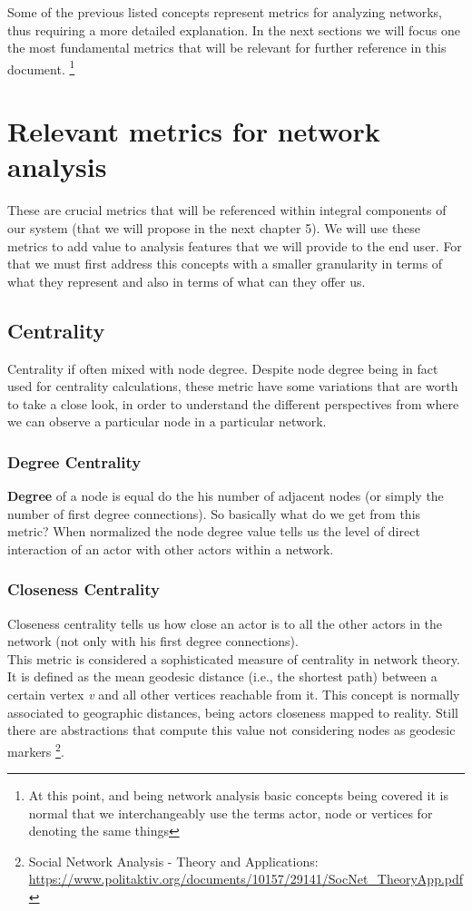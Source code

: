 Some of the previous listed concepts represent metrics for analyzing networks, thus requiring a more detailed explanation. In the next sections we will focus one the most fundamental metrics that will be relevant for further reference in this document. \footnote{At this point, and being network analysis basic concepts being covered it is normal that we interchangeably use the terms actor, node or vertices for denoting the same things}

\section{Relevant metrics for network analysis}
These are crucial metrics that will be referenced within integral components of our system (that we will propose in the next chapter 5). We will use these metrics to add value to analysis features that we will provide to the end user. For that we must first address this concepts with a smaller granularity in terms of
what they represent and also in terms of what can they offer us.

\subsection{Centrality}
Centrality if often mixed with node degree. Despite node degree being in fact used for centrality calculations, these metric have some variations
that are worth to take a close look, in order to understand the different perspectives from where we can observe a particular node in a particular network.

\subsubsection*{Degree Centrality}
\textbf{Degree} of a node is equal do the his number of adjacent nodes (or simply the number of first degree connections).
So basically what do we get from this metric? When normalized the node degree value tells us the level of direct interaction of an actor with other
actors within a network.

\subsubsection*{Closeness Centrality}
Closeness centrality tells us how close an actor is to all the other actors in the network (not only with his first degree connections).\\
\indent This metric is considered a sophisticated measure of centrality in network theory. It is defined as the mean geodesic distance
(i.e., the shortest path) between a certain vertex \textit{v} and all other vertices reachable from it. This concept is normally associated to
geographic distances, being actors closeness mapped to reality. Still there are abstractions that compute
this value not considering nodes as geodesic markers \footnote{Social Network Analysis - Theory and Applications: \url{https://www.politaktiv.org/documents/10157/29141/SocNet_TheoryApp.pdf}}.


